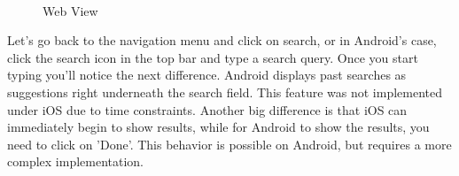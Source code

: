 \begin{figure}[H]
        \myfloatalign
         \quad
         \\
        \caption[Web View]{Web View}
\end{figure}

Let's go back to the navigation menu and click on search, or in Android's case, click the search icon in the top bar and type a search query. Once you start typing you'll notice the next difference. Android displays past searches as suggestions right underneath the search field. This feature was not implemented under iOS due to time constraints. Another big difference is that iOS can immediately begin to show results, while for Android to show the results, you need to click on 'Done'. This behavior is possible on Android, but requires a more complex implementation.

